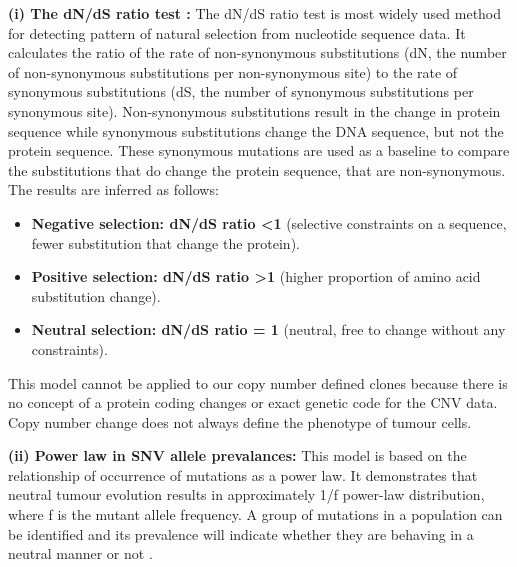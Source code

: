 \textbf{(i) The dN/dS ratio test \cite{martincorena2017universal}:} 
The dN/dS ratio test is most widely used method for detecting pattern of natural selection from nucleotide sequence data. It calculates the ratio of the rate of non-synonymous substitutions (dN, the number of non-synonymous substitutions per non-synonymous site) to the rate of synonymous substitutions (dS, the number of synonymous substitutions per synonymous site). Non-synonymous substitutions result in the change in protein sequence while synonymous substitutions change the DNA sequence, but not the protein sequence. These synonymous mutations are used as a baseline to compare the substitutions that do change the protein sequence, that are non-synonymous. The results are inferred as follows:
\begin{itemize}
     \item \textbf{Negative selection: dN/dS ratio <1} (selective constraints on a sequence, fewer substitution that change the protein). 
 \item \textbf{Positive selection: dN/dS ratio >1} (higher proportion of amino acid substitution change).
\item \textbf{Neutral selection: dN/dS ratio = 1} (neutral, free to change without any constraints).
\end{itemize}
This model cannot be applied to our copy number defined clones because there is no concept of a protein coding changes or exact genetic code for the CNV data. Copy number change does not always define the phenotype of tumour cells.




\textbf{(ii) Power law in SNV allele prevalances:} This model is based on the relationship of occurrence of mutations as a power law. It demonstrates that neutral tumour evolution results in approximately 1/f power-law distribution, where f is the mutant allele frequency.
A group of mutations in a population can be identified and its prevalence will indicate whether they are behaving in a neutral manner or not \cite{williams2016identification}.

